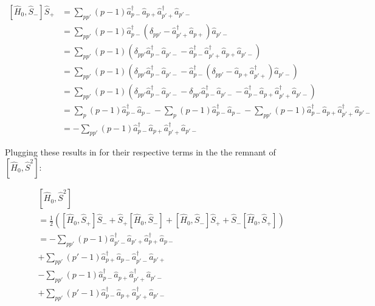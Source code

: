 \documentclass[11pt]{article}
\newcommand{\sop}[1]{%
	\ensuremath{ \hat{S}_{#1} } }
\newcommand{\cop}[2]{%
	\ensuremath{ \hat{a} _{#1 #2} ^{\dagger} }}
\newcommand{\aop}[2]{%
	\ensuremath{ \hat{a} _{#1 #2} }}
\newcommand{\krondelt}[2]{%
	\ensuremath{ \delta _{#1 #2} }}
\newcommand{\hop}{
	\ensuremath{ \hat{H} _0 }}
\newcommand{\commutator}[2]{%
	\ensuremath{ \left [ #1,#2 \right ] }}
\begin{document}
\begin{align*}
	\commutator{\hop}{\sop{-}} \sop{+} &= \sum _{pp'} (p-1) \cop{p}{-} \aop{p}{+} \cop{p'}{+} \aop{p'}{-}\\
	&= \sum _{pp'} (p-1) \cop{p}{-} \left ( \krondelt{p}{p'} - \cop{p'}{+} \aop{p}{+} \right ) \aop{p'}{-}\\
	&= \sum _{pp'} (p-1) \left ( \krondelt{p}{p'} \cop{p}{-} \aop{p'}{-} - \cop{p}{-} \cop{p'}{+} \aop{p}{+} \aop{p'}{-} \right )\\
	&= \sum _{pp'} (p-1) \left ( \krondelt{p}{p'} \cop{p}{-} \aop{p'}{-} - \cop{p}{-} \left ( \krondelt{p}{p'} - \aop{p}{+} \cop{p'}{+} \right ) \aop{p'}{-} \right )\\
	&= \sum _{pp'} (p-1) \left ( \krondelt{p}{p'} \cop{p}{-} \aop{p'}{-} - \krondelt{p}{p'} \cop{p}{-} \aop{p'}{-} - \cop{p}{-} \aop{p}{+} \cop{p'}{+} \aop{p'}{-} \right )\\
	&= \sum _{p} (p-1)  \cop{p}{-} \aop{p}{-} - \sum _{p} (p-1) \cop{p}{-} \aop{p}{-} - \sum _{pp'} (p-1) \cop{p}{-} \aop{p}{+} \cop{p'}{+} \aop{p'}{-}\\
	&= - \sum _{pp'} (p-1) \cop{p}{-} \aop{p}{+} \cop{p'}{+} \aop{p'}{-}
\end{align*}

Plugging these results in for their respective terms in the the remnant of $ \left [ \hat{H}_0, \hat{S}^2 \right ]$:

\begin{align*}
	& \left [ \hat{H}_0, \hat{S}^2 \right ]\\
	&= \frac{1}{2} \left ( \commutator{\hop}{\sop{+}} \sop{-} + \sop{+} \commutator{\hop}{\sop{-}} + \commutator{\hop}{\sop{-}} \sop{+} + \sop{-} \commutator{\hop}{\sop{+}} \right )\\
	&= - \sum _{pp'} (p-1) \cop{p'}{-} \aop{p'}{+} \cop{p}{+} \aop{p}{-}\\
	& + \sum _{pp'} (p'-1) \cop{p}{+} \aop{p}{-} \cop{p'}{-} \aop{p'}{+}\\
	& - \sum _{pp'} (p-1) \cop{p}{-} \aop{p}{+} \cop{p'}{+} \aop{p'}{-}\\
	& + \sum _{pp'} (p'-1) \cop{p}{-} \aop{p}{+} \cop{p'}{+} \aop{p'}{-}
\end{align*}
\end{document}
